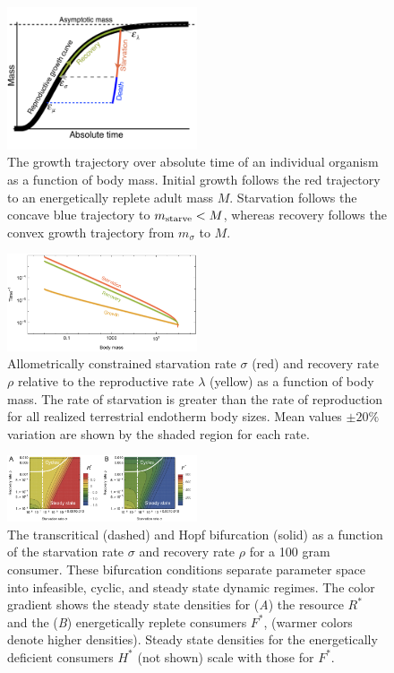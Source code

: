 \documentclass{pnastwo}
\begin{document}
\begin{figure}
\centering
\includegraphics[width=0.5\textwidth]{Growth-trajectory-diagram.pdf}
\caption{ The growth trajectory over absolute time of an individual organism
  as a function of body mass.  Initial growth follows the red trajectory to
  an energetically replete adult mass $M$.  Starvation follows the concave
  blue trajectory to $m_{\rm starve} < M$, whereas recovery follows the
  convex growth trajectory from $m_\sigma$ to $M$.  }
\label{fig:growth}
\end{figure}

\begin{figure}
\centering
\includegraphics[width=0.5\textwidth]{fig_Rates.pdf}
\caption{ 
Allometrically constrained starvation rate $\sigma$ (red) and recovery rate $\rho$ relative to the reproductive rate $\lambda$ (yellow) as a function of body mass.  
The rate of starvation is greater than the rate of reproduction for all realized terrestrial endotherm body sizes.
Mean values $\pm 20\%$ variation are shown by the shaded region for each rate.
}
\label{fig:gvs}
\end{figure}

\begin{figure}
\centering
\includegraphics[width=0.5\textwidth]{fig_FixedPoint.pdf}
\caption{ The transcritical (dashed) and Hopf bifurcation (solid) as a
  function of the starvation rate $\sigma$ and recovery rate $\rho$ for a 100 gram consumer.  These
  bifurcation conditions separate parameter space into infeasible, cyclic,
  and steady state dynamic regimes.  The color gradient shows the steady
  state densities for (\emph{A}) the resource $R^*$ and the (\emph{B}) energetically
  replete consumers $F^*$, (warmer colors denote higher densities).  Steady
  state densities for the energetically deficient consumers $H^*$ (not shown)
  scale with those for $F^*$.  }
\label{fig:fp}
\end{figure}
\end{document}
